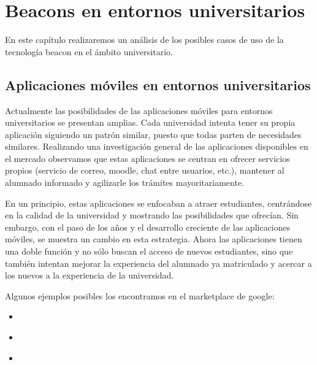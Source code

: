 %
%
%
%


\chapter{Beacons en entornos universitarios} \label{chap:BeaconsEntornosUniversitarios}  


En este capítulo realizaremos un análisis de los posibles casos de uso de la tecnología beacon en el ámbito universitario.

 
\section{Aplicaciones móviles en entornos universitarios}


Actualmente las posibilidades de las aplicaciones móviles para entornos universitarios se presentan amplias.  Cada universidad intenta tener su propia aplicación siguiendo un patrón similar, puesto que todas parten de necesidades similares. Realizando una investigación general de las aplicaciones disponibles en el mercado observamos que estas aplicaciones se centran en ofrecer servicios propios (servicio de correo, moodle, chat entre usuarios, etc.), mantener al alumnado informado y agilizarle los trámites mayoritariamente. 

En un principio, estas aplicaciones se enfocaban a atraer estudiantes, centrándose en la calidad de la universidad y mostrando las posibilidades que ofrecían. Sin embargo, con el paso de los años y el desarrollo creciente de las aplicaciones móviles, se muestra un cambio en esta estrategia. Ahora las aplicaciones tienen una doble función y no sólo buscan el acceso de nuevos estudiantes, sino que también intentan mejorar la experiencia del alumnado ya matriculado y acercar a los nuevos a la experiencia de la universidad. 



Algunos ejemplos posibles los encontramos en el marketplace de google:

\begin{itemize}
\item \cite{URL::galileo}
\item \cite{URL::valladolid}
\item \cite{URL::oviedo}
\end{itemize}


